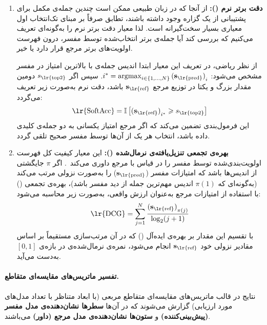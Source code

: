 \begin{enumerate}
    \item \textbf{دقت برتر نرم ():} از آنجا که در زبان طبیعی ممکن است چندین جمله‌ی مکمل برای پشتیبانی از یک گزاره وجود داشته باشند، تطابق صرفاً بر مبنای تک‌انتخاب اول معیاری بسیار سخت‌گیرانه است. لذا معیار دقت برتر نرم را به‌گونه‌ای تعریف می‌کنیم که بررسی کند آیا جمله‌ی برتر انتخاب‌شده توسط مفسر، درون فهرست اولویت‌های برتر مرجع قرار دارد یا خیر.
    
    از نظر ریاضی، در تعریف این معیار ابتدا اندیس جمله‌ی با بالاترین امتیاز در مفسر مشخص می‌شود: $i^* = \operatorname*{argmax}_{i \in {\{1,\dots,N\}}} {(\mathbf{s}_{\text{\lr{pred}}})}_i$. سپس اگر $s_{\text{\lr{top2}}}$ دومین مقدار بزرگ و یکتا در توزیع مرجع $\mathbf{s}_{\text{\lr{ref}}}$ باشد، دقت نرم به‌صورت زیر تعریف می‌گردد:
    \begin{equation}
        \text{\lr{SoftAcc}} = \mathbb{I}\left[ {(\mathbf{s}_{\text{\lr{ref}}})}_{i^*} \ge s_{\text{\lr{top2}}} \right]
    \end{equation}
    این فرمول‌بندی تضمین می‌کند که اگر مرجع امتیاز یکسانی به دو جمله‌ی کلیدی داده باشد، انتخاب هر یک از آن‌ها توسط مفسر صحیح تلقی گردد.

    \item \textbf{بهره‌ی تجمعی تنزیل‌یافته‌ی نرمال‌شده ():} این معیار کیفیت کل فهرست اولویت‌بندی‌شده توسط مفسر را در قیاس با مرجع داوری می‌کند~\cite{jarvelin2002cumulated}.
    اگر $\pi$ جایگشتی از اندیس‌ها باشد که امتیازات مفسر ($\mathbf{s}_{\text{\lr{pred}}}$) را به‌صورت نزولی مرتب می‌کند (به‌گونه‌ای که $\pi(1)$ اندیس مهم‌ترین جمله از دید مفسر باشد)، بهره‌ی تجمعی () با استفاده از امتیازات مرجع به‌عنوان ارزش واقعی، به‌صورت زیر محاسبه می‌شود:
    \begin{equation}
        \text{\lr{DCG}} = \sum_{j=1}^{N} \frac{{(\mathbf{s}_{\text{\lr{ref}}})}_{\pi(j)}}{\log_2(j+1)}
    \end{equation}
    با تقسیم این مقدار بر بهره‌ی ایده‌آل () که در آن مرتب‌سازی مستقیماً بر اساس مقادیر نزولی خود $\mathbf{s}_{\text{\lr{ref}}}$ انجام می‌شود، نمره‌ی نرمال‌شده‌ی  در بازه‌ی $[0, 1]$ به‌دست می‌آید.
\end{enumerate}

\paragraph{تفسیر ماتریس‌های مقایسه‌ای متقاطع.}
نتایج در قالب ماتریس‌های مقایسه‌ای متقاطع مربعی (با ابعاد متناظر با تعداد مدل‌های مورد ارزیابی) گزارش می‌شوند که در آن‌ها \textbf{سطرها نشان‌دهنده‌ی مدل مفسر (پیش‌بینی‌کننده)} و \textbf{ستون‌ها نشان‌دهنده‌ی مدل مرجع (داور)} می‌باشند.

